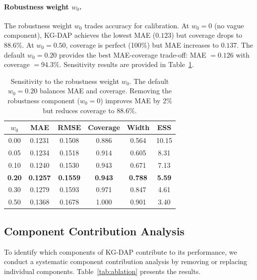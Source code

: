 \documentclass[12pt]{article}
\begin{document}
\paragraph{Robustness weight $w_0$.}
The robustness weight $w_0$ trades accuracy for calibration. At $w_0 = 0$ (no vague component), KG-DAP achieves the lowest MAE ($0.123$) but coverage drops to 88.6\%. At $w_0 = 0.50$, coverage is perfect (100\%) but MAE increases to $0.137$. The default $w_0 = 0.20$ provides the best MAE-coverage trade-off: MAE $= 0.126$ with coverage $= 94.3\%$. Sensitivity results are provided in Table~\ref{tab:sensitivity_w0}.

\begin{table}[t]
\centering
\caption{Sensitivity to the robustness weight $w_0$. The default $w_0 = 0.20$ balances MAE and coverage. Removing the robustness component ($w_0 = 0$) improves MAE by 2\% but reduces coverage to 88.6\%.}
\label{tab:sensitivity_w0}
\begin{tabular}{cccccc}
\toprule
$w_0$ & MAE & RMSE & Coverage & Width & ESS \\
\midrule
0.00 & 0.1231 & 0.1508 & 0.886 & 0.564 & 10.15 \\
0.05 & 0.1234 & 0.1518 & 0.914 & 0.605 & 8.31 \\
0.10 & 0.1240 & 0.1530 & 0.943 & 0.671 & 7.13 \\
\textbf{0.20} & \textbf{0.1257} & \textbf{0.1559} & \textbf{0.943} & \textbf{0.788} & \textbf{5.59} \\
0.30 & 0.1279 & 0.1593 & 0.971 & 0.847 & 4.61 \\
0.50 & 0.1368 & 0.1678 & 1.000 & 0.901 & 3.40 \\
\bottomrule
\end{tabular}
\end{table}

\subsection{Component Contribution Analysis}
\label{sec:ablation}

To identify which components of KG-DAP contribute to its performance, we conduct a systematic component contribution analysis by removing or replacing individual components. Table~\ref{tab:ablation} presents the results.
\end{document}
